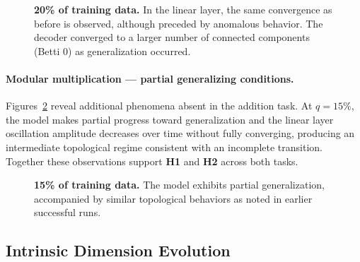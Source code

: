 \begin{figure}
    \centering
    
    
    \caption[20\% of training data (Modular Product).]{\textbf{20\% of training data.} In the linear layer, the same convergence as before is observed, although preceded by anomalous behavior. The decoder converged to a larger number of connected components (Betti 0) as generalization occurred.}
    \label{fig:prod-decoder0-linear-20pct}
\end{figure}

\paragraph{Modular multiplication — partial generalizing conditions.}
Figures~\ref{fig:prod-decoder0-linear-15pct}  reveal additional phenomena absent in the addition task. At $q = 15\%$, the model makes partial progress toward generalization and the linear layer oscillation amplitude decreases over time without fully converging, producing an intermediate topological regime consistent with an incomplete transition. Together these observations support \textbf{H1} and \textbf{H2} across both tasks.

\begin{figure}[htbp]
    \centering
    
    
    \caption[15\% of training data (Modular Product).]{\textbf{15\% of training data.} The model exhibits partial generalization, accompanied by similar topological behaviors as noted in earlier successful runs.}
    \label{fig:prod-decoder0-linear-15pct}
\end{figure}



\subsection{Intrinsic Dimension Evolution}
\label{subsec:results_id}

